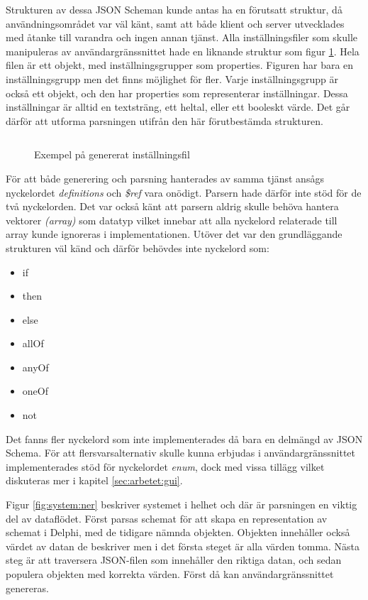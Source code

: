 Strukturen av dessa JSON Scheman kunde antas ha en förutsatt struktur, då användningsområdet var väl känt, samt att både klient och server utvecklades med åtanke till varandra och ingen annan tjänst. Alla inställningsfiler som skulle manipuleras av användargränssnittet hade en liknande struktur som figur \ref{fig:profile-file}. Hela filen är ett objekt, med inställningsgrupper som properties. Figuren har bara en inställningsgrupp men det finns möjlighet för fler. Varje inställningsgrupp är också ett objekt, och den har properties som representerar inställningar. Dessa inställningar är alltid en textsträng, ett heltal, eller ett booleskt värde. Det går därför att utforma parsningen utifrån den här förutbestämda strukturen.

\begin{figure}
	\inputminted[tabsize=2, frame=single, fontsize=\small, framesep=2mm, breaklines]{json}{code/0.json}
	\vspace{-1.7em}
	\caption{Exempel på genererat inställningsfil}
	\label{fig:profile-file}
\end{figure}
\FloatBarrier

\noindent
För att både generering och parsning hanterades av samma tjänst ansågs nyckelordet \textit{definitions} och \textit{\$ref} vara onödigt. Parsern hade därför inte stöd för de två nyckelorden. Det var också känt att parsern aldrig skulle behöva hantera vektorer \textit{(array)} som datatyp vilket innebar att alla nyckelord relaterade till array kunde ignoreras i implementationen. Utöver det var den grundläggande strukturen väl känd och därför behövdes inte nyckelord som:

\begin{itemize}
	\item if
	\item then
	\item else
	\item allOf
	\item anyOf
	\item oneOf
	\item not
\end{itemize}

\noindent
Det fanns fler nyckelord som inte implementerades då bara en delmängd av JSON Schema. För att flersvarsalternativ skulle kunna erbjudas i användargränssnittet implementerades stöd för nyckelordet \textit{enum}, dock med vissa tillägg vilket diskuteras mer i kapitel \ref{sec:arbetet:gui}.

Figur \ref{fig:system:ner} beskriver systemet i helhet och där är parsningen en viktig del av dataflödet. Först parsas schemat för att skapa en representation av schemat i Delphi, med de tidigare nämnda objekten. Objekten innehåller också värdet av datan de beskriver men i det första steget är alla värden tomma. Nästa steg är att traversera JSON-filen som innehåller den riktiga datan, och sedan populera objekten med korrekta värden. Först då kan användargränssnittet genereras.

